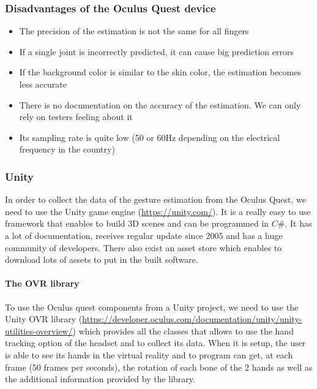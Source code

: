 \documentclass{article}
\begin{document}
\subsubsection{Disadvantages of the Oculus Quest device}
\begin{itemize}
	\item The precision of the estimation is not the same for all fingers
	\item If a single joint is incorrectly predicted, it can cause big prediction errors \cite{ref:oculus1}
	\item If the background color is similar to the skin color, the estimation becomes less accurate \cite{ref:oculus1}
	\item There is no documentation on the accuracy of the estimation. We can only rely on testers feeling about it \cite{ref:oculus3}
	\item Its sampling rate is quite low (50 or 60Hz depending on the electrical frequency in the country)
\end{itemize}


\subsubsection{Unity}

In order to collect the data of the gesture estimation from the Oculus Quest, we need to use the Unity game engine (\url{https://unity.com/}). It is a really easy to use framework that enables to build 3D scenes and can be programmed in $C\#$. It has a lot of documentation, receives regular update since 2005 and has a huge community of developers. There also exist an asset store which enables to download lots of assets to put in the built software.\cite{ref:oculus4}

\paragraph{The OVR library}

To use the Oculus quest components from a Unity project, we need to use the Unity OVR library (\url{https://developer.oculus.com/documentation/unity/unity-utilities-overview/}) which provides all the classes that allows to use the hand tracking option of the headset and to collect its data. When it is setup, the user is able to see its hands in the virtual reality and to program can get, at each frame (50 frames per seconds), the rotation of each bone of the 2 hands as well as the additional information provided by the library.
\end{document}

